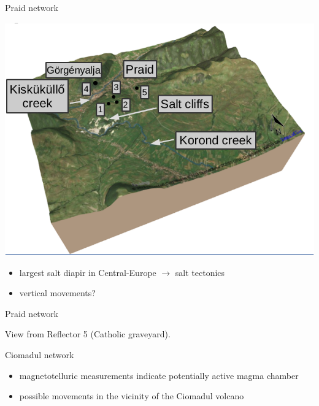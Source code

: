 \documentclass{beamer}
\begin{document}
\begin{frame}{Praid network}
    \begin{minipage}[c]{0.7\textwidth}
        \includegraphics[width=\textwidth]{parajd_3D_mod.png}
    \end{minipage}
    \hspace{5pt}
    \begin{minipage}[c]{0.225\textwidth}
        \begin{itemize}
            \item largest salt diapir in Central-Europe $\rightarrow$ salt tectonics
            \item vertical movements?
        \end{itemize}
    \end{minipage}
\end{frame}


\begin{frame}{Praid network}
    \begin{minipage}[c]{0.75\textwidth}
    \end{minipage}
    \hspace{10pt}
    \begin{minipage}[c]{0.195\textwidth}
        View from Reflector 5 (Catholic graveyard).
    \end{minipage}
\end{frame}


\begin{frame}{Ciomadul network}
    \begin{minipage}[c]{0.65\textwidth}
        \centering
    \end{minipage}
    \hspace{5pt}
    \begin{minipage}[c]{0.3\textwidth}
        \begin{itemize}
            \item magnetotelluric measurements indicate potentially active magma chamber
            \item possible movements in the vicinity of the Ciomadul volcano
        \end{itemize}
    \end{minipage}
\end{frame}
\end{document}
